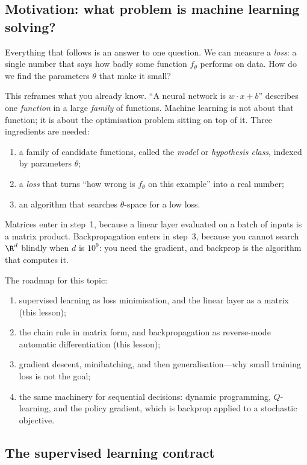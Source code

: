
\subsection{Motivation: what problem is machine learning solving?}

Everything that follows is an answer to one question. We can measure a
\emph{loss}: a single number that says how badly some function $f_\theta$
performs on data. How do we find the parameters $\theta$ that make it small?

This reframes what you already know. ``A neural network is
$w\cdot x+b$'' describes one \emph{function} in a large \emph{family} of
functions. Machine learning is not about that function; it is about the
optimisation problem sitting on top of it. Three ingredients are needed:
\begin{enumerate}[label=\arabic*.]
  \item a family of candidate functions, called the \emph{model} or
    \emph{hypothesis class}, indexed by parameters $\theta$;
  \item a \emph{loss} that turns ``how wrong is $f_\theta$ on this example''
    into a real number;
  \item an algorithm that searches $\theta$-space for a low loss.
\end{enumerate}
Matrices enter in step~1, because a linear layer evaluated on a batch of
inputs is a matrix product. Backpropagation enters in step~3, because you
cannot search $\R^{d}$ blindly when $d$ is $10^9$: you need the gradient,
and backprop is the algorithm that computes it.

The roadmap for this topic:
\begin{enumerate}[label=\arabic*.]
  \item supervised learning as loss minimisation, and the linear layer as a
    matrix (this lesson);
  \item the chain rule in matrix form, and backpropagation as reverse-mode
    automatic differentiation (this lesson);
  \item gradient descent, minibatching, and then generalisation---why small
    training loss is not the goal;
  \item the same machinery for sequential decisions: dynamic programming,
    $Q$-learning, and the policy gradient, which is backprop applied to a
    stochastic objective.
\end{enumerate}

\subsection{The supervised learning contract}


